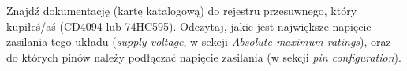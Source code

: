 \documentclass{pdfBooklets}
\begin{document}
\begin{Zadanie}{}{}
  Znajdź dokumentację (kartę katalogową) do rejestru przesuwnego, który kupiłeś/aś (CD4094 lub 74HC595).
  Odczytaj, jakie jest największe napięcie zasilania tego układu (\textit{supply voltage}, w sekcji
  \textit{Absolute maximum ratings}), oraz do których pinów należy podłączać napięcie zasilania (w sekcji \textit{pin configuration}).
\end{Zadanie}


\end{document}
